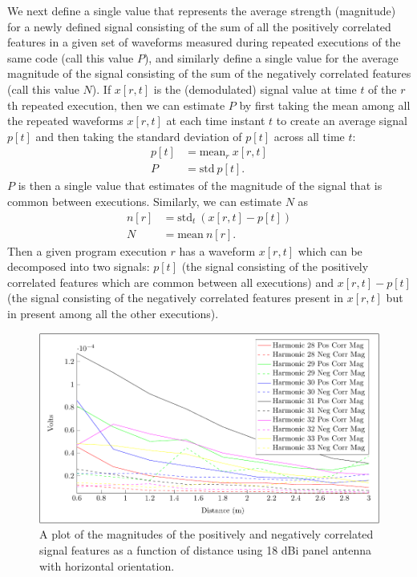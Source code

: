 We next define a single value that represents the average strength (magnitude) for a newly defined signal consisting of the sum of all the positively correlated features in a given set of waveforms measured during repeated executions of the same code (call this value $P$), and similarly define a single value for the average magnitude of the signal consisting of the sum of the negatively correlated features (call this value $N$). If $x[r,t]$ is the (demodulated) signal value at time $t$ of the $r$th repeated execution, then we can estimate $P$ by first taking the mean among all the repeated waveforms $x[r,t]$ at each time instant $t$ to create an average signal $p[t]$ and then taking the standard deviation of $p[t]$ across all time $t$:
\begin{equation}
\begin{aligned}
p[t] &= \textrm{mean}_r \> x[r,t] \\
P &= \textrm{std} \> p[t].
\end{aligned}
\end{equation}
$P$ is then a single value that estimates of the magnitude of the signal that is common between executions. Similarly, we can estimate $N$ as
\begin{equation}
\begin{aligned}
n[r] &= \textrm{std}_t \> (x[r,t] - p[t]) \\
N &= \textrm{mean} \> n[r].
\end{aligned}
\end{equation}
Then a given program execution $r$ has a waveform $x[r,t]$ which can be decomposed into two signals: $p[t]$ (the signal consisting of the positively correlated features which are common between all executions) and $x[r,t] - p[t]$ (the signal consisting of the negatively correlated features present in $x[r,t]$ but in present among all the other executions). 

\begin{figure}[hbt]
\includegraphics[width=5in]{snr_distance}
\caption{A plot of the magnitudes of the positively and negatively correlated signal features as a function of distance using 18 dBi panel antenna with horizontal orientation.}
\label{snr_distance}
\end{figure}

